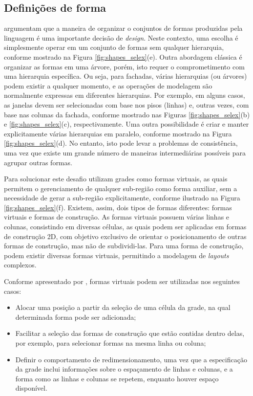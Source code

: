\subsection{Definições de forma}
\label{sec:selex_definicao_formas}

 argumentam que a maneira de organizar o conjuntos de formas produzidas pela linguagem é uma importante decisão de \textit{design}. Neste contexto, uma escolha é simplesmente operar em um conjunto de formas sem qualquer hierarquia, conforme mostrado na Figura \ref{fig:shapes_selex}(e). Outra abordagem clássica é organizar as formas em uma árvore, porém, isto requer o comprometimento com uma hierarquia específica. Ou seja, para fachadas, várias hierarquias (ou árvores) podem existir a qualquer momento, e as operações de modelagem são normalmente expressas em diferentes hierarquias. Por exemplo, em alguns casos, as janelas devem ser selecionadas com base nos pisos (linhas) e, outras vezes, com base nas colunas da fachada, conforme mostrado nas Figuras \ref{fig:shapes_selex}(b) e \ref{fig:shapes_selex}(c), respectivamente. Uma outra possibilidade é criar e manter explicitamente várias hierarquias em paralelo, conforme mostrado na Figura \ref{fig:shapes_selex}(d). No entanto, isto pode levar a problemas de consistência, uma vez que existe um grande número de maneiras intermediárias possíveis para agrupar outras formas.

Para solucionar este desafio  utilizam grades como formas virtuais, as quais permitem o gerenciamento de qualquer sub-região como forma auxiliar, sem a necessidade de gerar a sub-região explicitamente, conforme ilustrado na Figura \ref{fig:shapes_selex}(f). Existem, assim, dois tipos de formas diferentes: formas virtuais e formas de construção. As formas virtuais possuem várias linhas e colunas, consistindo em diversas células, as quais podem ser aplicadas em formas de construção 2D, com objetivo exclusivo de orientar o posicionamento de outras formas de construção, mas não de subdividi-las. Para uma forma de construção, podem existir diversas formas virtuais, permitindo a modelagem de \textit{layouts} complexos.

Conforme apresentado por , formas virtuais podem ser utilizadas nos seguintes casos:

\begin{itemize}
    \item Alocar uma posição a partir da seleção de uma célula da grade, na qual determinada forma pode ser adicionada;
    
    \item Facilitar a seleção das formas de construção que estão contidas dentro delas, por exemplo, para selecionar formas na mesma linha ou coluna;
    
    \item Definir o comportamento de redimensionamento, uma vez que a especificação da grade inclui informações sobre o espaçamento de linhas e colunas, e a forma como as linhas e colunas se repetem, enquanto houver espaço disponível.
\end{itemize}

